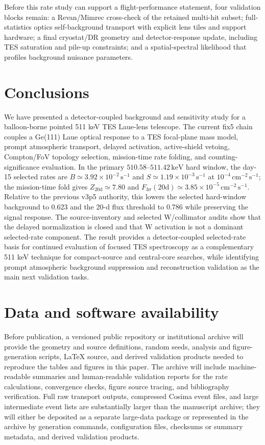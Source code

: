 \documentclass[preprint,12pt]{elsarticle}
\newcommand{\keV}{\,\mathrm{keV}}
\newcommand{\cms}{\,\mathrm{cm^{-2}\,s^{-1}}}
\newcommand{\cps}{\,\mathrm{s^{-1}}}
\newcommand{\fthree}{F_{3\sigma}}
\begin{document}
Before this rate study can support a flight-performance statement, four validation blocks remain: a Revan/Mimrec cross-check of the retained multi-hit subset; full-statistics optics self-background transport with explicit lens tiles and support hardware; a final cryostat/DR geometry and detector-response update, including TES saturation and pile-up constraints; and a spatial-spectral likelihood that profiles background nuisance parameters.

\section{Conclusions}
\label{sec:conclusions}

We have presented a detector-coupled background and sensitivity study for a balloon-borne pointed 511 keV TES Laue-lens telescope. The current fix5 chain couples a Ge(111) Laue optical response to a TES focal-plane mass model, prompt atmospheric transport, delayed activation, active-shield vetoing, Compton/FoV topology selection, mission-time rate folding, and counting-significance evaluation. In the primary $510.58$--$511.42\keV$ hard window, the day-15 selected rates are $B\simeq3.92\times10^{-2}\cps$ and $S\simeq1.19\times10^{-3}\cps$ at $10^{-4}\cms$; the mission-time fold gives $Z_{20\mathrm{d}}\simeq7.80$ and $\fthree(20\mathrm{d})\simeq3.85\times10^{-5}\cms$. Relative to the previous v3p5 authority, this lowers the selected hard-window background to 0.623 and the 20-d flux threshold to 0.786 while preserving the signal response. The source-inventory and selected W/collimator audits show that the delayed normalization is closed and that W activation is not a dominant selected-rate component. The result provides a detector-coupled selected-rate basis for continued evaluation of focused TES spectroscopy as a complementary 511 keV technique for compact-source and central-core searches, while identifying prompt atmospheric background suppression and reconstruction validation as the main next validation tasks.

\section*{Data and software availability}
Before publication, a versioned public repository or institutional archive will
provide the geometry and source definitions, random seeds, analysis and
figure-generation scripts, LaTeX source, and derived validation products needed
to reproduce the tables and figures in this paper. The archive will include
machine-readable summaries and human-readable validation reports for the rate
calculations, convergence checks, figure source tracing, and bibliography
verification. Full raw transport outputs, compressed Cosima event files, and
large intermediate event lists are substantially larger than the manuscript
archive; they will either be deposited as a separate large-data package or
represented in the archive by generation commands, configuration files,
checksums or summary metadata, and derived validation products.
\end{document}
